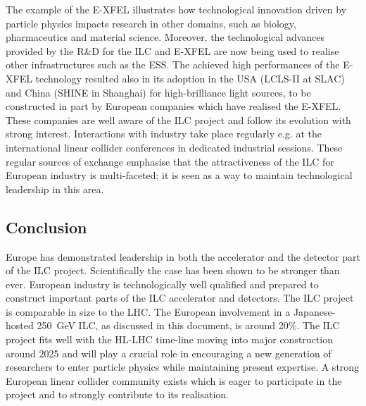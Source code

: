 \documentclass[%
 reprint,
 floatfix,
 amsmath,amssymb,
 aps,
]{revtex4-1}
\begin{document}
The example of the E-XFEL illustrates how technological innovation driven by particle physics impacts research in other domains, such as biology, pharmaceutics and material science. Moreover, the technological advances provided by the R\&D for the ILC and E-XFEL are now being used to realise other infrastructures such as the ESS.
The achieved high performances of the E-XFEL technology resulted also in its adoption in the USA (LCLS-II at SLAC) and China (SHINE in Shanghai) for high-brilliance light sources, to be constructed in part by European companies which have realised the E-XFEL. These companies are well aware of the ILC project and follow its evolution with strong interest. Interactions with industry take place regularly e.g. at the international linear collider conferences in dedicated industrial sessions. These regular sources of exchange emphasise that the attractiveness of the ILC for European industry is multi-faceted; 
it is seen as a way to maintain technological leadership in this area. 

\subsection{Conclusion}
Europe has demonstrated leadership in both the accelerator and the detector part of the ILC project. Scientifically the case has been shown to be stronger than ever. European industry is technologically well qualified and prepared to construct important parts of the ILC accelerator and detectors. The ILC project is comparable in size to the LHC. The European involvement in a Japanese-hosted 250~GeV ILC, as discussed in this document, is around 20\%. The ILC project fits well with the HL-LHC time-line moving into major construction around 2025 and will play a crucial role in encouraging a new generation of researchers to enter particle physics while maintaining present expertise. A strong European linear collider community exists which is eager to participate in the project and to strongly contribute to its realisation. 





\end{document}
